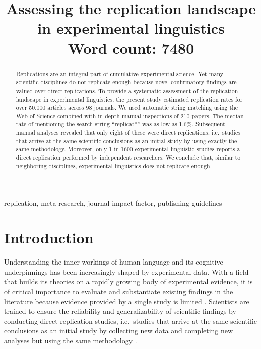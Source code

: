 \documentclass[cm,linguex]{glossa}
\title[]{Assessing the replication landscape in experimental linguistics\\ \bigskip \large Word count: 7480}
\author[]{
  }
\begin{document}
\sffamily
\maketitle

\begin{abstract}
Replications are an integral part of cumulative experimental science. Yet many scientific disciplines do not replicate enough because novel confirmatory findings are valued over direct replications. To provide a systematic assessment of the replication landscape in experimental linguistics, the present study estimated replication rates for over 50.000 articles across 98 journals. We used automatic string matching using the Web of Science combined with in-depth manual inspections of 210 papers. The median rate of mentioning the search string ``replicat*'' was as low as 1.6\%. Subsequent manual analyses revealed that only eight of these were direct replications, i.e.~studies that arrive at the same scientific conclusions as an initial study by using exactly the same methodology. Moreover, only 1 in 1600 experimental linguistic studies reports a direct replication performed by independent researchers. We conclude that, similar to neighboring disciplines, experimental linguistics does not replicate enough.
\end{abstract}

\begin{keywords}
  replication, meta-research, journal impact factor, publishing guidelines
\end{keywords}

\rmfamily

\hypertarget{introduction}{%
\section{Introduction}\label{introduction}}

Understanding the inner workings of human language and its cognitive underpinnings has been increasingly shaped by experimental data. With a field that builds its theories on a rapidly growing body of experimental evidence, it is of critical importance to evaluate and substantiate existing findings in the literature because evidence provided by a single study is limited \citep[e.g.,][]{amrhein2019inferential}. Scientists are trained to ensure the reliability and generalizability of scientific findings by conducting direct replication studies, i.e.~studies that arrive at the same scientific conclusions as an initial study by collecting new data and completing new analyses but using the same methodology \citep[see][ for a comprehensive overview of different terminological uses]{barba_terminologies_2018}.
\end{document}
